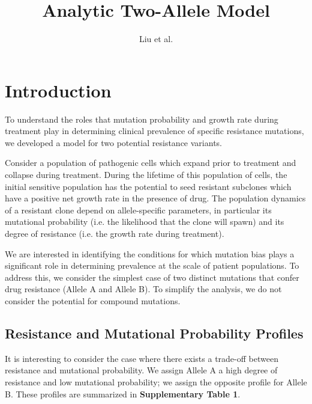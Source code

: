 \documentclass{article}
\title{Analytic Two-Allele Model}
\author{Liu et al.}
\begin{document}
\maketitle



\section{Introduction}

To understand the roles that mutation probability and growth rate during treatment play in determining clinical prevalence of specific resistance mutations, we developed a model for two potential resistance variants.

Consider a population of pathogenic cells which expand prior to treatment and collapse during treatment.  During the lifetime of this population of cells, the initial sensitive population has the potential to seed resistant subclones which have a positive net growth rate in the presence of drug.  The population dynamics of a resistant clone depend on allele-specific parameters, in particular its mutational probability (i.e. the likelihood that the clone will spawn) and its degree of resistance (i.e. the growth rate during treatment).

We are interested in identifying the conditions for which mutation bias plays a significant role in determining prevalence at the scale of patient populations.  To address this, we consider the simplest case of two distinct mutations that confer drug resistance (Allele A and Allele B).  To simplify the analysis, we do not consider the potential for compound mutations.


\subsection{Resistance and Mutational Probability Profiles}

It is interesting to consider the case where there exists a trade-off between resistance and mutational probability.  We assign Allele A a high degree of resistance and low mutational probability; we assign the opposite profile for Allele B.  These profiles are summarized in \textbf{Supplementary Table 1}.
\end{document}
